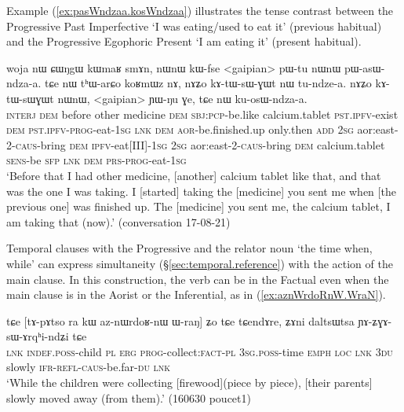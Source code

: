Example (\ref{ex:pasWndzaa.kosWndzaa}) illustrates the tense contrast between the Progressive Past Imperfective  `I was eating/used to eat it' (previous habitual) and the Progressive Egophoric Present  `I am eating it' (present habitual).
\largerpage
\begin{exe}
\ex \label{ex:pasWndzaa.kosWndzaa}
\gll woja nɯ ɕɯŋgɯ kɯmaʁ smɤn, nɯnɯ kɯ-fse <gaipian> pɯ-tu nɯnɯ pɯ-asɯ-ndza-a. tɕe nɯ tʰɯ-arɕo koʁmɯz nɤ, nɤʑo kɤ-tɯ-sɯ-ɣɯt nɯ tu-ndze-a. nɤʑo kɤ-tɯ-sɯɣɯt nɯnɯ, <gaipian> ɲɯ-ŋu ɣe, tɕe nɯ ku-osɯ-ndza-a. \\
\textsc{interj} \textsc{dem} before other medicine \textsc{dem} \textsc{sbj}:\textsc{pcp}-be.like calcium.tablet \textsc{pst}.\textsc{ipfv}-exist \textsc{dem} \textsc{pst}.\textsc{ipfv}-\textsc{prog}-eat-\textsc{1sg} \textsc{lnk} \textsc{dem} \textsc{aor}-be.finished.up only.then \textsc{add} \textsc{2sg} aor:east-2-\textsc{caus}-bring \textsc{dem} \textsc{ipfv}-eat[III]-\textsc{1sg}  \textsc{2sg} aor:east-2-\textsc{caus}-bring \textsc{dem} calcium.tablet \textsc{sens}-be \textsc{sfp} \textsc{lnk} \textsc{dem} \textsc{prs}-\textsc{prog}-eat-\textsc{1sg} \\
\glt `Before that I had other medicine, [another] calcium tablet like that, and that was the one I was taking. I [started] taking the [medicine] you sent me when [the previous one] was finished up. The [medicine] you sent me, the calcium tablet, I am taking that (now).' (conversation 17-08-21)
\end{exe}

Temporal clauses with the Progressive and the relator noun  `the time when, while' can express simultaneity (§\ref{sec:temporal.reference}) with the action of the main clause. In this construction, the verb can be in the Factual even when the main clause is in the Aorist or the Inferential, as in (\ref{ex:aznWrdoRnW.WraN}).

\begin{exe}
\ex \label{ex:aznWrdoRnW.WraN}
\gll tɕe [tɤ-pɤtso ra kɯ az-nɯrdoʁ-nɯ ɯ-raŋ] ʑo tɕe tɕendɤre, ʑɤni daltsɯtsa ɲɤ-ʑɣɤ-sɯ-ɤrqʰi-ndʑi tɕe \\
\textsc{lnk} \textsc{indef}.\textsc{poss}-child \textsc{pl} \textsc{erg} \textsc{prog}-collect:\textsc{fact}-\textsc{pl} \textsc{3sg}.\textsc{poss}-time \textsc{emph} \textsc{loc} \textsc{lnk} \textsc{3du} slowly \textsc{ifr}-\textsc{refl}-\textsc{caus}-be.far-\textsc{du} \textsc{lnk} \\
\glt `While the children were collecting [firewood](piece by piece), [their parents] slowly moved away (from them).' (160630 poucet1)
\end{exe}

